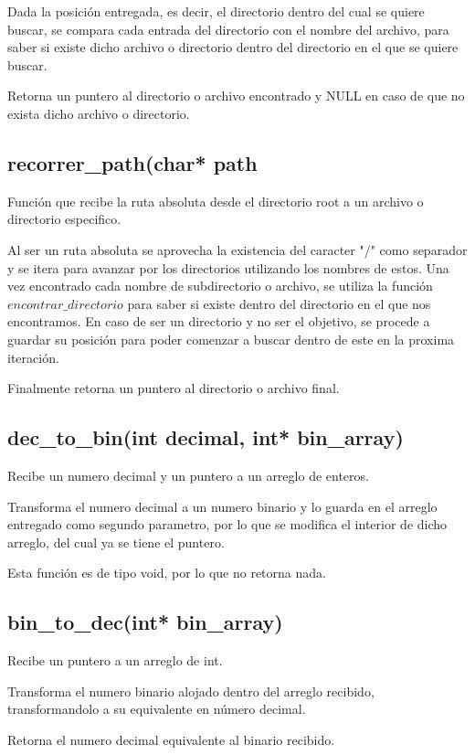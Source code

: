 \documentclass[12pt]{article}
\begin{document}
Dada la posición entregada, es decir, el directorio dentro del cual se quiere buscar, se compara cada entrada del directorio con el nombre del archivo, para saber si existe dicho archivo o directorio dentro del directorio en el que se quiere buscar. 

Retorna un puntero al directorio o archivo encontrado y NULL en caso de que no exista dicho archivo o directorio.

\subsection{recorrer\_path(char* path}
Función que recibe la ruta absoluta desde el directorio root a un archivo o directorio especifico.

Al ser un ruta absoluta se aprovecha la existencia del caracter "/" como separador y se itera para avanzar por los directorios utilizando los nombres de estos. Una vez encontrado cada nombre de subdirectorio o archivo, se utiliza la función $encontrar\_directorio$ para saber si existe dentro del directorio en el que nos encontramos. En caso de ser un directorio y no ser el objetivo, se procede a guardar su posición para poder comenzar a buscar dentro de este en la proxima iteración. 

Finalmente retorna un puntero al directorio o archivo final.

\subsection{dec\_to\_bin(int decimal, int* bin\_array)}
Recibe un numero decimal y un puntero a un arreglo de enteros.

Transforma el numero decimal a un numero binario y lo guarda en el arreglo entregado como segundo parametro, por lo que se modifica el interior de dicho arreglo, del cual ya se tiene el puntero.

Esta función es de tipo void, por lo que no retorna nada.

\subsection{bin\_to\_dec(int* bin\_array)}
Recibe un puntero a un arreglo de int.

Transforma el numero binario alojado dentro del arreglo recibido, transformandolo a su equivalente en número decimal.

Retorna el numero decimal equivalente al binario recibido.
\end{document}
